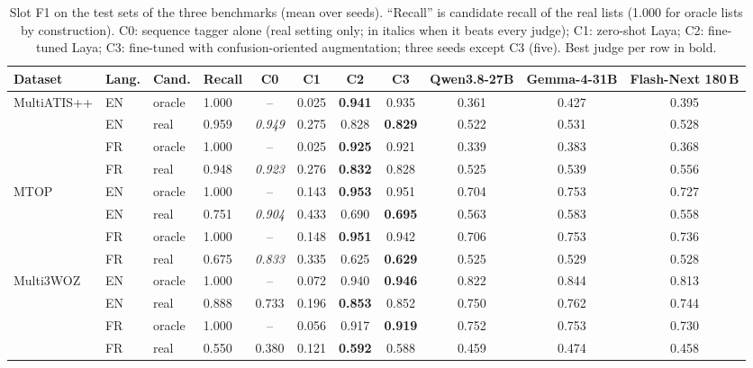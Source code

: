 \begin{table}[pos=t]
\centering
\small
\caption{Slot F1 on the test sets of the three benchmarks (mean over seeds). ``Recall'' is candidate recall of the real lists (1.000 for oracle lists by construction). C0: sequence tagger alone (real setting only; in italics when it beats every judge); C1: zero-shot Laya; C2: fine-tuned Laya; C3: fine-tuned with confusion-oriented augmentation; three seeds except C3 (five). Best judge per row in bold.}
\label{tab:rq1-all}
\setlength{\tabcolsep}{3.5pt}
\begin{tabular}{@{}llllccccccc@{}}
\toprule
Dataset & Lang. & Cand. & Recall & C0 & C1 & C2 & C3 & Qwen3.8-27B & Gemma-4-31B & Flash-Next 180\,B \\
\midrule
MultiATIS++ & EN & oracle & 1.000 & -- & 0.025 & \textbf{0.941} & 0.935 & 0.361 & 0.427 & 0.395 \\
            & EN & real   & 0.959 & \emph{0.949} & 0.275 & 0.828 & \textbf{0.829} & 0.522 & 0.531 & 0.528 \\
            & FR & oracle & 1.000 & -- & 0.025 & \textbf{0.925} & 0.921 & 0.339 & 0.383 & 0.368 \\
            & FR & real   & 0.948 & \emph{0.923} & 0.276 & \textbf{0.832} & 0.828 & 0.525 & 0.539 & 0.556 \\
MTOP & EN & oracle & 1.000 & -- & 0.143 & \textbf{0.953} & 0.951 & 0.704 & 0.753 & 0.727 \\
     & EN & real   & 0.751 & \emph{0.904} & 0.433 & 0.690 & \textbf{0.695} & 0.563 & 0.583 & 0.558 \\
     & FR & oracle & 1.000 & -- & 0.148 & \textbf{0.951} & 0.942 & 0.706 & 0.753 & 0.736 \\
     & FR & real   & 0.675 & \emph{0.833} & 0.335 & 0.625 & \textbf{0.629} & 0.525 & 0.529 & 0.528 \\
Multi3WOZ & EN & oracle & 1.000 & -- & 0.072 & 0.940 & \textbf{0.946} & 0.822 & 0.844 & 0.813 \\
          & EN & real   & 0.888 & 0.733 & 0.196 & \textbf{0.853} & 0.852 & 0.750 & 0.762 & 0.744 \\
          & FR & oracle & 1.000 & -- & 0.056 & 0.917 & \textbf{0.919} & 0.752 & 0.753 & 0.730 \\
          & FR & real   & 0.550 & 0.380 & 0.121 & \textbf{0.592} & 0.588 & 0.459 & 0.474 & 0.458 \\
\bottomrule
\end{tabular}
\end{table}

